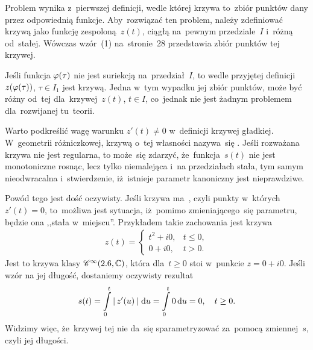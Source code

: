 \documentclass[a4paper,11pt]{article}
\begin{document}
Problem wynika z~pierwszej definicji, wedle której krzywa to~zbiór
punktów dany przez odpowiednią funkcje. Aby~rozwiązać ten problem,
należy zdefiniować krzywą jako funkcję zespoloną~$z( t )$, ciągłą
na~pewnym przedziale~$I$ i~różną od~stałej. Wówczas wzór~(1)
na~stronie~28 przedstawia zbiór punktów tej krzywej.

\vspace{\spaceFour}


\start {} Jeśli funkcja $\varphi( \tau )$ nie jest suriekcją
na~przedział~$I$, to wedle przyjętej definicji~$z( \varphi( \tau ) )$,
$\tau \in I_{ 1 }$ jest krzywą. Jedna w~tym wypadku jej zbiór punktów,
może być różny od~tej dla~krzywej~$z( t )$, $t \in I$, co~jednak nie
jest żadnym problemem dla~rozwijanej tu~teorii.

\vspace{\spaceFour}


\start {} Warto podkreślić wagę warunku $z'( t ) \neq 0$
w~definicji krzywej gładkiej. W~geometrii różniczkowej, krzywą o~tej
własności nazywa~się . Jeśli rozważana krzywa nie jest
regularna, to może~się zdarzyć, że~funkcja~$s( t )$ nie jest
monotoniczne rosnąc, lecz tylko niemalejąca i~na przedziałach stała,
tym samym nieodwracalna i~stwierdzenie, iż~istnieje parametr
kanoniczny jest nieprawdziwe.

Powód tego jest dość oczywisty. Jeśli krzywa ma~,
czyli punkty w~których~$z'( t ) = 0$, to~możliwa jest sytuacja,
iż~pomimo zmieniającego~się parametru, będzie ona ,,stała w~miejscu''.
Przykładem takie zachowania jest krzywa
\begin{equation}
  \label{eq:Leja-28}
  \begin{split}
    z( t ) =
    \begin{cases}
      t^{ 2 } + i 0, & t \leq 0, \\
      0 + i 0, & t > 0.
    \end{cases}
  \end{split}
\end{equation}
Jest to krzywa klasy $\mathcal{C}^{ \infty }( 2.6, \mathbb{C} )$, która dla~$t \geq 0$ stoi
w~punkcie $z = 0 + i 0$. Jeśli wzór na jej długość, dostaniemy
oczywisty rezultat
\begin{equation}
  \label{eq:Leja-29}
  \begin{split}
    s( t ) = \int\limits_{ 0 }^{ t } \left| \,  z'( u )  \, \right| \, \mathrm{d} u = \int\limits_{ 0 }^{
      t } 0 \, \mathrm{d} u = 0, \quad t \geq 0.
  \end{split}
\end{equation}
Widzimy więc, że~krzywej tej nie da~się sparametryzować za~pomocą
zmiennej~$s$, czyli jej długości.
\end{document}
